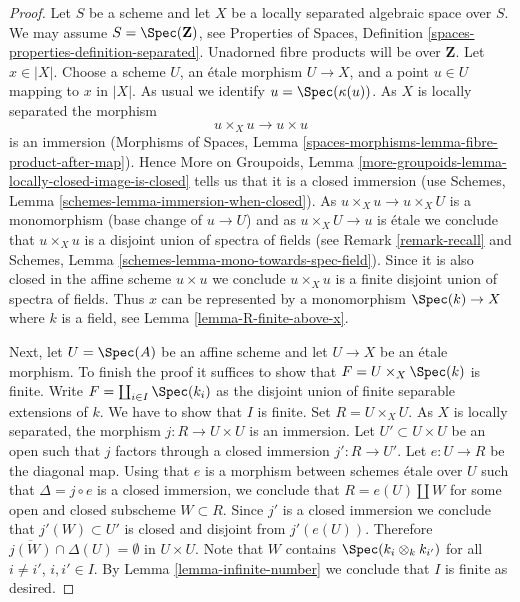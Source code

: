 \begin{proof}
Let $S$ be a scheme and let $X$ be a locally separated algebraic space
over $S$. We may assume $S = \Spec(\mathbf{Z})$, see
Properties of Spaces, Definition \ref{spaces-properties-definition-separated}.
Unadorned fibre products will be over $\mathbf{Z}$.
Let $x \in |X|$. Choose a scheme $U$, an \'etale
morphism $U \to X$, and a point $u \in U$ mapping to $x$ in $|X|$.
As usual we identify $u = \Spec(\kappa(u))$.
As $X$ is locally separated the morphism
$$
u \times_X u \to u \times u
$$
is an immersion (Morphisms of Spaces, Lemma
\ref{spaces-morphisms-lemma-fibre-product-after-map}).
Hence More on Groupoids, Lemma
\ref{more-groupoids-lemma-locally-closed-image-is-closed}
tells us that it is a closed immersion (use
Schemes, Lemma \ref{schemes-lemma-immersion-when-closed}).
As $u \times_X u \to u \times_X U$ is a monomorphism (base change
of $u \to U$) and as $u \times_X U \to u$ is \'etale we conclude that
$u \times_X u$ is a disjoint union of spectra of fields
(see Remark \ref{remark-recall} and
Schemes, Lemma \ref{schemes-lemma-mono-towards-spec-field}).
Since it is also closed in the affine scheme $u \times u$ we
conclude $u \times_X u$ is a finite disjoint union of spectra of fields.
Thus $x$ can be represented by a monomorphism $\Spec(k) \to X$ where $k$
is a field, see
Lemma \ref{lemma-R-finite-above-x}.

\medskip\noindent
Next, let $U = \Spec(A)$ be an affine scheme and let $U \to X$ be an
\'etale morphism. To finish the proof it suffices to show that
$F = U \times_X \Spec(k)$ is finite. Write $F = \coprod_{i \in I} \Spec(k_i)$
as the disjoint union of finite separable extensions of $k$.
We have to show that $I$ is finite.
Set $R = U \times_X U$. As $X$ is locally separated, the morphism
$j : R \to U \times U$ is an immersion. Let $U' \subset U \times U$
be an open such that $j$ factors through a closed immersion $j' : R \to U'$.
Let $e : U \to R$ be the diagonal map. Using that $e$ is a morphism between
schemes \'etale over $U$ such that $\Delta = j \circ e$ is a
closed immersion, we conclude that $R = e(U) \amalg W$ for some
open and closed subscheme $W \subset R$. Since $j'$ is a closed immersion
we conclude that $j'(W) \subset U'$ is closed and disjoint from
$j'(e(U))$. Therefore
$\overline{j(W)} \cap \Delta(U) = \emptyset$ in $U \times U$.
Note that $W$ contains $\Spec(k_i \otimes_k k_{i'})$ for all
$i \not = i'$, $i, i' \in I$. By Lemma \ref{lemma-infinite-number}
we conclude that $I$ is finite as desired.
\end{proof}








